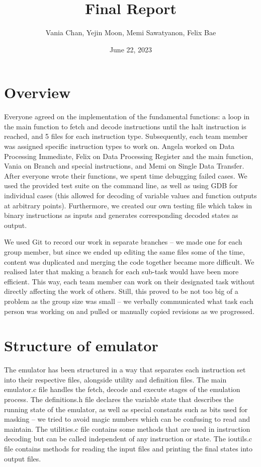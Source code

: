 \documentclass{article}
\title{Final Report}
\author{Vania Chan, Yejin Moon, Memi Sawatyanon, Felix Bae}
\date{June 22, 2023}
\begin{document}
\maketitle

\section{Overview}

Everyone agreed on the implementation of the fundamental functions: a loop in the main function to fetch and decode instructions until the halt instruction is reached, and 5 files for each instruction type. Subsequently, each team member was assigned specific instruction types to work on. Angela worked on Data Processing Immediate, Felix on Data Processing Register and the main function, Vania on Branch and special instructions, and Memi on Single Data Transfer. After everyone wrote their functions, we spent time debugging failed cases. We used the provided test suite on the command line, as well as using GDB for individual cases (this allowed for decoding of variable values and function outputs at arbitrary points). Furthermore, we created our own testing file which takes in binary instructions as inputs and generates corresponding decoded states as output.

We used Git to record our work in separate branches – we made one for each group member, but since we ended up editing the same files some of the time, content was duplicated and merging the code together became more difficult. We realised later that making a branch for each sub-task would have been more efficient. This way, each team member can work on their designated task without directly affecting the work of others. Still, this proved to be not too big of a problem as the group size was small – we verbally communicated what task each person was working on and pulled or manually copied revisions as we progressed.

\section{Structure of emulator}

The emulator has been structured in a way that separates each instruction set into their respective files, alongside utility and definition files. The main emulator.c file handles the fetch, decode and execute stages of the emulation process. The definitions.h file declares the variable state that describes the running state of the emulator, as well as special constants such as bits used for masking – we tried to avoid magic numbers which can be confusing to read and maintain. The utilities.c file contains some methods that are used in instruction decoding but can be called independent of any instruction or state. The ioutils.c file contains methods for reading the input files and printing the final states into output files.
\end{document}
